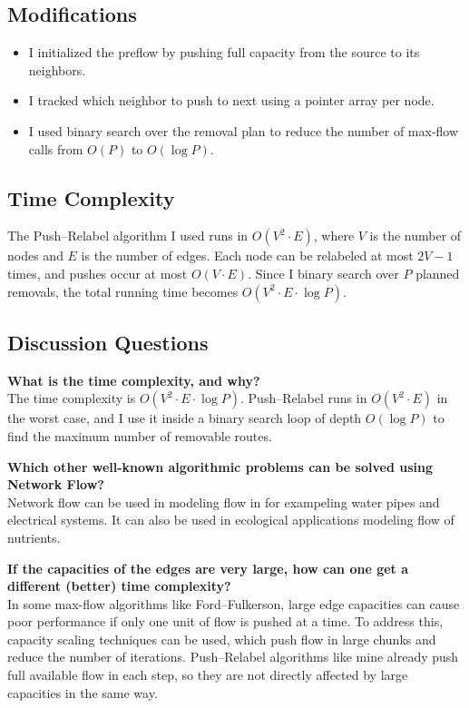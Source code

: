 \documentclass{article}
\begin{document}
\subsection*{Modifications}
\begin{itemize}
  \item I initialized the preflow by pushing full capacity from the source to its neighbors.
  \item I tracked which neighbor to push to next using a pointer array per node.
  \item I used binary search over the removal plan to reduce the number of max-flow calls from \( O(P) \) to \( O(\log P) \).
\end{itemize}

\subsection*{Time Complexity}
The Push–Relabel algorithm I used runs in \( O(V^2 \cdot E) \), where \( V \) is the number of nodes and \( E \) is the number of edges. Each node can be relabeled at most \( 2V - 1 \) times, and pushes occur at most \( O(V \cdot E) \). Since I binary search over \( P \) planned removals, the total running time becomes \( O(V^2 \cdot E \cdot \log P) \).

\subsection*{Discussion Questions}

\textbf{What is the time complexity, and why?} \\
The time complexity is \( O(V^2 \cdot E \cdot \log P) \). Push–Relabel runs in \( O(V^2 \cdot E) \) in the worst case, and I use it inside a binary search loop of depth \( O(\log P) \) to find the maximum number of removable routes.

\vspace{1em}
\textbf{Which other well-known algorithmic problems can be solved using Network Flow?} \\
Network flow can be used in modeling flow in for exampeling water pipes and electrical systems. It can also be used in ecological applications modeling flow of nutrients.

\vspace{1em}
\textbf{If the capacities of the edges are very large, how can one get a different (better) time complexity?} \\
In some max-flow algorithms like Ford–Fulkerson, large edge capacities can cause poor performance if only one unit of flow is pushed at a time. To address this, capacity scaling techniques can be used, which push flow in large chunks and reduce the number of iterations. Push–Relabel algorithms like mine already push full available flow in each step, so they are not directly affected by large capacities in the same way.
\end{document}
